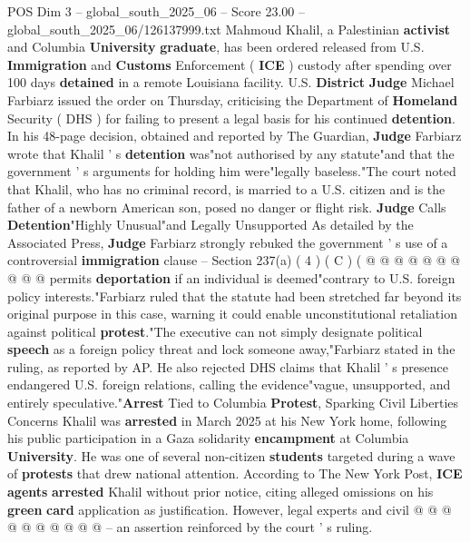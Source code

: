 \begin{textsample}{POS Dim 3 – global\_south\_2025\_06 – Score 23.00 – global\_south\_2025\_06/126137999.txt}  \label{ex:f3_pos_201}
Mahmoud Khalil, a Palestinian \textbf{activist} and Columbia \textbf{University} \textbf{graduate}, has been ordered released from U.S. \textbf{Immigration} and \textbf{Customs} Enforcement ( \textbf{ICE} ) custody after spending over 100 days \textbf{detained} in a remote Louisiana facility.
U.S. \textbf{District} \textbf{Judge} Michael Farbiarz issued the order on Thursday, criticising the Department of \textbf{Homeland} Security ( DHS ) for failing to present a legal basis for his continued \textbf{detention}.
In his 48-page decision, obtained and reported by The Guardian, \textbf{Judge} Farbiarz wrote that Khalil ' s \textbf{detention} was"not authorised by any statute"and that the government ' s arguments for holding him were"legally baseless."The court noted that Khalil, who has no criminal record, is married to a U.S. citizen and is the father of a newborn American son, posed no danger or flight risk. \textbf{Judge} Calls \textbf{Detention}"Highly Unusual"and Legally Unsupported As detailed by the Associated Press, \textbf{Judge} Farbiarz strongly rebuked the government ' s use of a controversial \textbf{immigration} clause -- Section 237(a) ( 4 ) ( C ) ( @ @ @ @ @ @ @ @ @ @ permits \textbf{deportation} if an individual is deemed"contrary to U.S. foreign policy interests."Farbiarz ruled that the statute had been stretched far beyond its original purpose in this case, warning it could enable unconstitutional retaliation against political \textbf{protest}."The executive can not simply designate political \textbf{speech} as a foreign policy threat and lock someone away,"Farbiarz stated in the ruling, as reported by AP.
He also rejected DHS claims that Khalil ' s presence endangered U.S. foreign relations, calling the evidence"vague, unsupported, and entirely speculative."\textbf{Arrest} Tied to Columbia \textbf{Protest}, Sparking Civil Liberties Concerns Khalil was \textbf{arrested} in March 2025 at his New York home, following his public participation in a Gaza solidarity \textbf{encampment} at Columbia \textbf{University}.
He was one of several non-citizen \textbf{students} targeted during a wave of \textbf{protests} that drew national attention.
According to The New York Post, \textbf{ICE} \textbf{agents} \textbf{arrested} Khalil without prior notice, citing alleged omissions on his \textbf{green} \textbf{card} application as justification.
However, legal experts and civil @ @ @ @ @ @ @ @ @ @ -- an assertion reinforced by the court ' s ruling.

\end{textsample}
